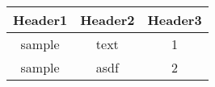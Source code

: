 \documentclass{article}
\begin{document}
\begin{tabular}{|c|c|c|}
\hline
Header1 & Header2 & Header3 \\
\hline
sample & text & 1 \\
\hline
sample & asdf & 2 \\
\hline
\end{tabular}
\end{document}
